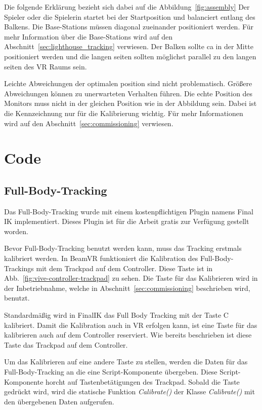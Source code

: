 Die folgende Erklärung bezieht sich dabei auf die Abbildung~\ref{fig:assembly}
Der Spieler oder die Spielerin startet bei der Startposition und balanciert entlang des Balkens.
Die Base-Stations müssen diagonal zueinander positioniert werden.
Für mehr Information über die Base-Stations wird auf den Abschnitt~\ref{sec:lighthouse_tracking} verwiesen.
Der Balken sollte ca in der Mitte positioniert werden und die langen seiten sollten möglichst parallel zu den langen seiten des VR Raums sein.

Leichte Abweichungen der optimalen position sind nicht problematisch.
Größere Abweichungen können zu unerwarteten Verhalten führen.
Die echte Position des Monitors muss nicht in der gleichen Position wie in der Abbildung sein.
Dabei ist die Kennzeichnung nur für die Kalibrierung wichtig.
Für mehr Informationen wird auf den Abschnitt~\ref{sec:commissioning} verwiesen.

\section{Code}
\label{sec:code}

\subsection{Full-Body-Tracking}
\label{sec:full-body-tracking}

Das Full-Body-Tracking wurde mit einem kostenpflichtigen Plugin namens Final IK implementiert.
Dieses Plugin ist für die Arbeit gratis zur Verfügung gestellt worden.

Bevor Full-Body-Tracking benutzt werden kann, muss das Tracking erstmals kalibriert werden.
In BeamVR funktioniert die Kalibration des Full-Body-Trackings mit dem Trackpad auf dem Controller.
Diese Taste ist in Abb.~\ref{fig:vive-controller-trackpad} zu sehen.
Die Taste für das Kalibrieren wird in der Inbetriebnahme, welche in Abschnitt~\ref{sec:commissioning} beschrieben wird, benutzt.

Standardmäßig wird in FinalIK das Full Body Tracking mit der Taste C kalibriert.
Damit die Kalibration auch in VR erfolgen kann, ist eine Taste für das kalibrieren auch auf dem Controller reserviert.
Wie bereits beschrieben ist diese Taste das Trackpad auf dem Controller.

Um das Kalibrieren auf eine andere Taste zu stellen, werden die Daten für das Full-Body-Tracking an die eine Script-Komponente übergeben.
Diese Script-Komponente horcht auf Tastenbetätigungen des Trackpad.
Sobald die Taste gedrückt wird, wird die statische Funktion \emph{Calibrate()} der Klasse \emph{Calibrate()} mit den übergebenen Daten aufgerufen.

